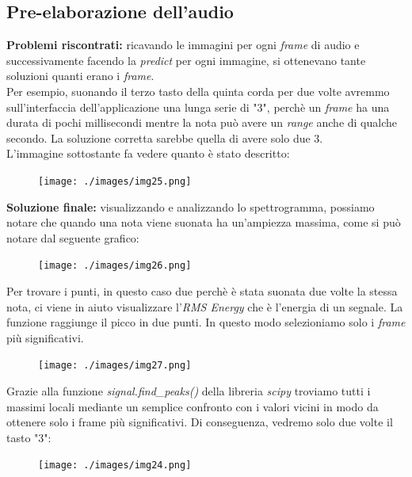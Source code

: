 \subsection{Pre-elaborazione dell'audio}
\textbf{Problemi riscontrati:} ricavando le immagini per ogni \textit{frame} di audio e successivamente facendo la \textit{predict} per ogni immagine, si ottenevano tante soluzioni quanti erano i \textit{frame}.\\ Per esempio, suonando il terzo tasto della quinta corda per due volte avremmo sull'interfaccia dell'applicazione una lunga serie di "3", perchè un \textit{frame} ha una durata di pochi millisecondi mentre la nota può avere un \textit{range} anche di qualche secondo. La soluzione corretta sarebbe quella di avere solo due 3. \\
\newline
L'immagine sottostante fa vedere quanto è stato descritto:
\begin{figure}[H]
	\centering
	\texttt{[image: ./images/img25.png]}
\end{figure}
\noindent \textbf{Soluzione finale:} visualizzando e analizzando lo spettrogramma, possiamo notare che quando una nota viene suonata ha un'ampiezza massima, come si può notare dal seguente grafico:
\begin{figure}[H]
	\centering
	\texttt{[image: ./images/img26.png]}
\end{figure}
\noindent Per trovare i punti, in questo caso due perchè è stata suonata due volte la stessa nota, ci viene in aiuto visualizzare l'\textit{RMS Energy} che è l'energia di un segnale. La funzione raggiunge il picco in due punti. In questo modo selezioniamo solo i \textit{frame} più significativi.
\begin{figure}[H]
	\centering
	\texttt{[image: ./images/img27.png]}
\end{figure}
\noindent Grazie alla funzione \textit{signal.find\_peaks()} della libreria \textit{scipy} troviamo tutti i massimi locali mediante un semplice confronto con i valori vicini in modo da ottenere solo i frame più significativi.
\vspace*{2ex}
\vspace*{2ex}
Di conseguenza, vedremo solo due volte il tasto "3":
\begin{figure}[H]
	\centering
	\texttt{[image: ./images/img24.png]}
\end{figure}
